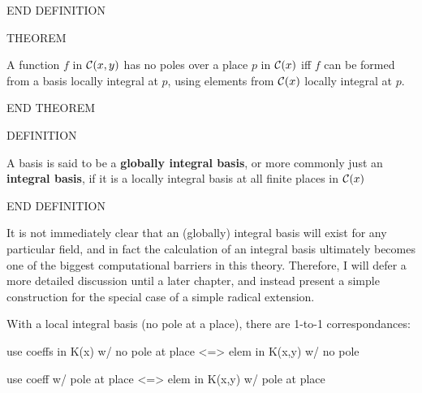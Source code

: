 END DEFINITION

THEOREM

A function $f$ in ${\cal C}(x,y)$ has no poles over a place $p$ in
${\cal C}(x)$ iff $f$ can be formed from a basis locally integral at
$p$, using elements from ${\cal C}(x)$ locally integral at $p$.

END THEOREM

DEFINITION

A basis is said to be a {\bf globally integral basis}, or more commonly
just an {\bf integral basis}, if it is a locally integral basis at
all finite places in ${\cal C}(x)$

END DEFINITION

It is not immediately clear that an (globally) integral basis will
exist for any particular field, and in fact the calculation of an
integral basis ultimately becomes one of the biggest computational
barriers in this theory.  Therefore, I will defer a more detailed
discussion until a later chapter, and instead present a simple
construction for the special case of a simple radical extension.

With a local integral basis (no pole at a place), there are 1-to-1
correspondances:

	use coeffs in K(x) w/ no pole at place <=> elem in K(x,y) w/ no pole

	use coeff w/ pole at place <=> elem in K(x,y) w/ pole at place

